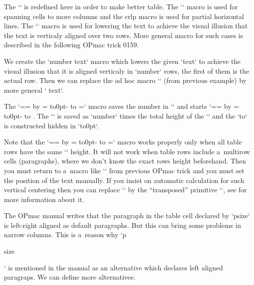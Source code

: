 The `\tabstrut` is redefined here in order to make better table. The `\mspan` macro is used for spanning cells to more columns and the {\tt{}}crlp macro is used for partial horizontal lines. The `\low` macro is used for lowering the text to achieve the visual illusion that the text is verticaly aligned over two rows. More general macro for such cases is described in the following OPmac trick 0159. 


 


We create the `\crow number {text}` macro which lowers the given `text` to achieve the visual illusion that it is aligned verticaly in `number` rows, the first of them is the actual row. Then we can replace the ad hoc macro `` (from previous example) by more general ` {text}`. 

\begtt
\def\crow{\afterassignment\crowA \tmpnum=} 
\def\crowA#1{\setbox0=\hbox{\tabstrut}\tmpdim=\ht0 \advance\tmpdim by\dp0 
   \tmpdim=\the\tmpnum\tmpdim 
   \vbox to0pt{\kern-\ht0 \vbox to\tmpdim{\vss\hbox{#1}\kern-\prevdepth\vss}\vss}%
} 
 
\endtt


The `\crow` macro saves the number in `\tmpnum` and starts `\crowA`. The `\tmpdim` is saved as `number` times the total height of the `\tabstrut` and the `\vbox to\tmpdim` is constructed hidden in `\vbox to0pt`. 



Note that the `\crow` macro works properly only when all table rows have the same `\tabstrut` height. It will not work when table rows include a~multirow cells (paragraphs), where we don't know the exact rows height beforehand. Then you must return to a~macro like `\low` from previous OPmac trick and you must set the position of the text manually. If you insist on automatic calculation for such vertical centering then you can replace `\halign` by the “transposed” primitive `\valign`, see  for more information about it. 


 


The OPmac manual writes that the paragraph in the table cell declared by `p{size}` is left-right aligned as default paragraphs. But this can bring some problems in narrow columns. This is a~reason why `p{size\raggedright}` is mentioned in the manual as an alternative which declares left aligned paragraps. We can define more alternatives: 

